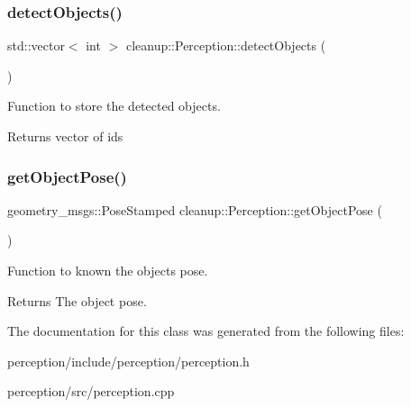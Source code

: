 \subsubsection{\texorpdfstring{detect\+Objects()}{detectObjects()}}
{\footnotesize\ttfamily std\+::vector$<$ int $>$ cleanup\+::\+Perception\+::detect\+Objects (\begin{DoxyParamCaption}{ }\end{DoxyParamCaption})}



Function to store the detected objects. 

\begin{DoxyReturn}{Returns}
vector of ids 
\end{DoxyReturn}
\mbox{\label{classcleanup_1_1_perception_a602ed7efc2ca9d418daa2aed25f4e3ba}} 
\subsubsection{\texorpdfstring{get\+Object\+Pose()}{getObjectPose()}}
{\footnotesize\ttfamily geometry\+\_\+msgs\+::\+Pose\+Stamped cleanup\+::\+Perception\+::get\+Object\+Pose (\begin{DoxyParamCaption}{ }\end{DoxyParamCaption})}



Function to known the object\textquotesingle{}s pose. 

\begin{DoxyReturn}{Returns}
The object pose. 
\end{DoxyReturn}


The documentation for this class was generated from the following files\+:\begin{DoxyCompactItemize}
\item 
perception/include/perception/perception.\+h\item 
perception/src/perception.\+cpp\end{DoxyCompactItemize}
